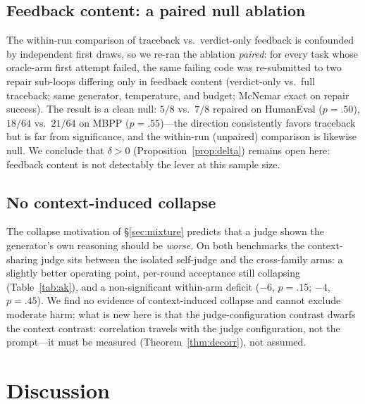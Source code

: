 \documentclass[10pt]{article}
\begin{document}
\subsection{Feedback content: a paired null ablation}
\label{sec:ablation}
The within-run comparison of traceback vs.\ verdict-only feedback
is confounded by independent first draws, so we re-ran the
ablation \emph{paired}: for every task whose oracle-arm first
attempt failed, the same failing code was re-submitted to
two repair sub-loops differing only in feedback content
(verdict-only vs.\ full traceback; same generator, temperature,
and budget; McNemar exact on repair success).  The result is a
clean null: $5/8$ vs.\ $7/8$ repaired on HumanEval ($p = .50$),
$18/64$ vs.\ $21/64$ on MBPP ($p = .55$)---the direction
consistently favors traceback but is far from significance, and
the within-run (unpaired) comparison is likewise null.  We conclude that
$\delta > 0$ (Proposition~\ref{prop:delta}) remains open here:
feedback content is not detectably the lever at this sample size.

\subsection{No context-induced collapse}
The collapse motivation of §\ref{sec:mixture} predicts that a
judge shown the generator's own reasoning should be \emph{worse}.
On both benchmarks the context-sharing judge sits between the
isolated self-judge and the cross-family arms: a slightly better
operating point, per-round acceptance still collapsing
(Table~\ref{tab:ak}), and a non-significant within-arm deficit
($-6$, $p = .15$; $-4$, $p = .45$).  We find no evidence of context-induced collapse and cannot
exclude moderate harm; what is new here is that the
judge-configuration contrast dwarfs the context contrast:
correlation travels with the judge configuration, not the
prompt---it must be measured (Theorem~\ref{thm:decorr}), not
assumed.


\section{Discussion}\label{sec:discussion}
\end{document}
